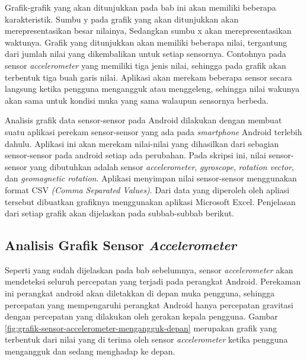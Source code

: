 Grafik-grafik yang akan ditunjukkan pada bab ini akan memiliki beberapa karakteristik. Sumbu y pada grafik yang akan ditunjukkan akan merepresentasikan besar nilainya, Sedangkan sumbu x akan merepresentasikan waktunya. Grafik yang ditunjukkan akan memiliki beberapa nilai, tergantung dari jumlah nilai yang dikembalikan untuk setiap sensornya. Contohnya pada sensor \textit{accelerometer} yang memiliki tiga jenis nilai, sehingga pada grafik akan terbentuk tiga buah garis nilai. Aplikasi akan merekam beberapa sensor secara langsung ketika pengguna mengangguk atau menggeleng, sehingga nilai wakunya akan sama untuk kondisi muka yang sama walaupun sensornya berbeda.

Analisis grafik data sensor-sensor pada Android dilakukan dengan membuat suatu aplikasi perekam sensor-sensor yang ada pada \textit{smartphone} Android terlebih dahulu. Aplikasi ini akan merekam nilai-nilai yang dihasilkan dari sebagian sensor-sensor pada android setiap ada perubahan. Pada skripsi ini, nilai sensor-sensor yang dibutuhkan adalah sensor \textit{accelerometer}, \textit{gyroscope}, \textit{rotation vector}, dan \textit{geomagnetic rotation}. Aplikasi menyimpan nilai sensor-sensor menggunakan format CSV \textit{(Comma Separated Values)}. Dari data yang diperoleh oleh apliasi tersebut dibuatkan grafiknya menggunakan aplikasi Microsoft Excel. Penjelasan dari setiap grafik akan dijelaskan pada subbab-subbab berikut.
\subsection{Analisis Grafik Sensor \textit{Accelerometer}}
\label{sec:analisis_grafik_sensor_accelerometer}
Seperti yang sudah dijelaskan pada bab sebelumnya, sensor \textit{accelerometer} akan mendeteksi seluruh percepatan yang terjadi pada perangkat Android. Perekaman ini perangkat android akan diletakkan di depan muka pengguna, sehingga percepatan yang mempengaruhi perangkat Android hanya percepatan gravitasi dengan percepatan yang dilakukan oleh gerakan kepala pengguna. Gambar \ref{fig:grafik-sensor-accelerometer-mengangguk-depan} merupakan grafik yang terbentuk dari nilai yang di terima oleh sensor \textit{accelerometer} ketika pengguna mengangguk dan sedang menghadap ke depan.

